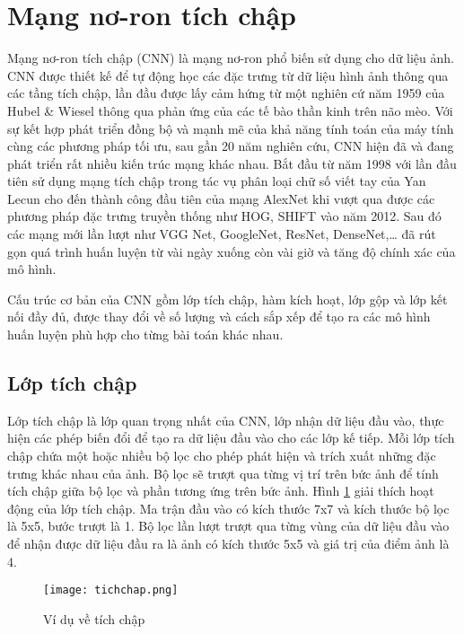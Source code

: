 \documentclass[../the.tex]{subfiles}
\begin{document}
\section{Mạng nơ-ron tích chập }
\label{sec:cnn}

{\fontsize{13}{12} \selectfont

	Mạng nơ-ron tích chập (CNN) là mạng nơ-ron phổ biến sử dụng cho dữ liệu ảnh.
	CNN được thiết kế để tự động học các đặc trưng từ dữ liệu hình ảnh thông qua các tầng tích chập, lần đầu được lấy cảm hứng từ một nghiên cứ năm 1959 của Hubel \& Wiesel \cite{hubel1962receptive} thông qua phản ứng của các tế bào thần kinh trên não mèo. Với sự kết hợp phát triển đồng bộ và mạnh mẽ của khả năng tính toán của máy tính cùng các phương pháp tối ưu,
	sau gần 20 năm nghiên cứu, CNN hiện đã và đang phát triển rất nhiều kiến trúc mạng khác nhau. Bắt đầu từ năm 1998 với lần đầu tiên sử dụng mạng tích chập trong tác vụ phân loại chữ số viết tay của Yan Lecun
	\cite{lecun1998gradient} cho đến thành công đầu tiên của mạng AlexNet khi vượt qua được các phương pháp đặc trưng truyền thống như HOG, SHIFT vào năm 2012. Sau đó các mạng mới lần lượt như VGG Net, GoogleNet, ResNet, DenseNet,\dots
	đã rút gọn quá trình huấn luyện từ vài ngày xuống còn vài giờ và tăng độ chính xác của mô hình.

}

\bigskip

{\fontsize{13}{12} \selectfont

	Cấu trúc cơ bản của CNN gồm lớp tích chập, hàm kích hoạt, lớp gộp và lớp kết nối đầy đủ, được thay đổi về số lượng và cách sắp xếp để tạo ra các mô hình huấn luyện phù hợp cho từng bài toán khác nhau.

}

\subsection{Lớp tích chập}

{\fontsize{13}{12} \selectfont

	Lớp tích chập là lớp quan trọng nhất của CNN, lớp nhận dữ liệu đầu vào, thực hiện các phép biến đổi để tạo ra dữ liệu đầu vào cho các lớp kế tiếp. Mỗi lớp tích chập chứa một hoặc nhiều bộ lọc cho phép phát hiện và trích xuất những đặc trưng khác nhau của ảnh.
	Bộ lọc sẽ trượt qua từng vị trí trên bức ảnh để tính tích chập giữa bộ lọc và phần tương ứng trên bức ảnh.
	Hình \ref{fig:hinh_tichchap} giải thích hoạt động của lớp tích chập. Ma trận đầu vào có kích thước 7x7 và kích thước bộ lọc là 5x5, bước trượt là 1. Bộ lọc lần lượt trượt qua từng vùng của dữ liệu đầu vào để nhận được
	dữ liệu đầu ra là ảnh có kích thước 5x5 và giá trị của điểm ảnh là 4.

}
\begin{figure}[H]
	\centering
	\texttt{[image: tichchap.png]}
	\caption{Ví dụ về tích chập}
	\label{fig:hinh_tichchap}
\end{figure}
\end{document}

